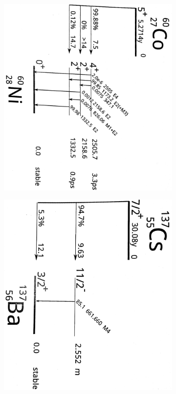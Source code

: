 \begin{figure}[h]
  \centering
  \begin{subfigure}[h]{0.4\textwidth}
    \centering
    \includegraphics[width=\textwidth, angle=90]{data/co_schema.jpg}
  \end{subfigure}%
  \begin{subfigure}[h]{0.4\textwidth}
    \centering
    \includegraphics[width=\textwidth,angle=90]{data/cs_schema.jpg}

\end{subfigure}
\end{figure}
